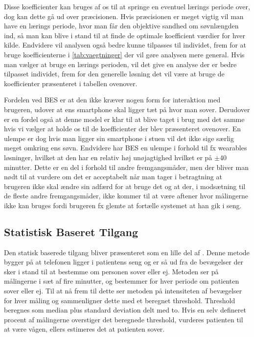 Disse koefficienter kan bruges af os til at springe en eventuel lærings periode over, dog kan dette gå ud over præcisionen.
Hvis præcisionen er meget vigtig vil man have en lærings periode, hvor man får den objektive sandhed om søvnlængden ind, så man kan blive i stand til at finde de optimale koefficient værdier for hver kilde.
Endvidere vil analysen også bedre kunne tilpasses til individet, frem for at bruge koefficienterne i \cref{tab:vaegtninger} der vil gøre analysen mere general.
Hvis man vælger at bruge en lærings perioden, vil det give en analyse der er bedre tilpasset individet, frem for den generelle løsning det vil være at bruge de koefficienter præsenteret i tabellen ovenover.

Fordelen ved BES er at den ikke kræver nogen form for interaktion med brugeren, udover at ens smartphone skal ligger tæt på hvor man sover.
Derudover er en fordel også at denne model er klar til at blive taget i brug med det samme hvis vi vælger at holde os til de koefficienter der blev præsenteret ovenover.
En ulempe er dog hvis man ligger sin smartphone i stuen vil det ikke sige særlig meget omkring ens søvn.
Endvidere har BES en ulempe i forhold til fx wearables løsninger, hvilket at den har en relativ høj unøjagtighed hvilket er på $\pm$40 minutter. 
Dette er en del i forhold til andre fremgangsmåder, men der bliver man nødt til at vurdere om det er acceptabelt når man tager i betragtning at brugeren ikke skal ændre sin adfærd for at bruge det og at der, i modsætning til de fleste andre fremgangsmåder, ikke kommer til at være aftener hvor målingerne ikke kan bruges fordi brugeren fx glemte at fortælle systemet at han gik i seng.

\subsection{Statistisk Baseret Tilgang}\label{sec:statbased}
Den statisk baserede tilgang bliver præsenteret som en lille del af \citet{misc:statbased}.
Denne metode bygger på at telefonen ligger i patientens seng og er så ud fra de bevægelser der sker i stand til at bestemme om personen sover eller ej.
Metoden ser på målingerne i sæt af fire minutter, og bestemmer for hver periode om patienten sover eller ej.
Til at nå frem til dette ser metoden på intensiteten af bevægelser for hver måling og sammenligner dette med et beregnet threshold.
Threshold beregnes som median plus standard deviation delt med to.
Hvis en selv defineret procent af målingerne overstiger det beregnede threshold, vurderes patienten til at være vågen, ellers estimeres det at patienten sover.

